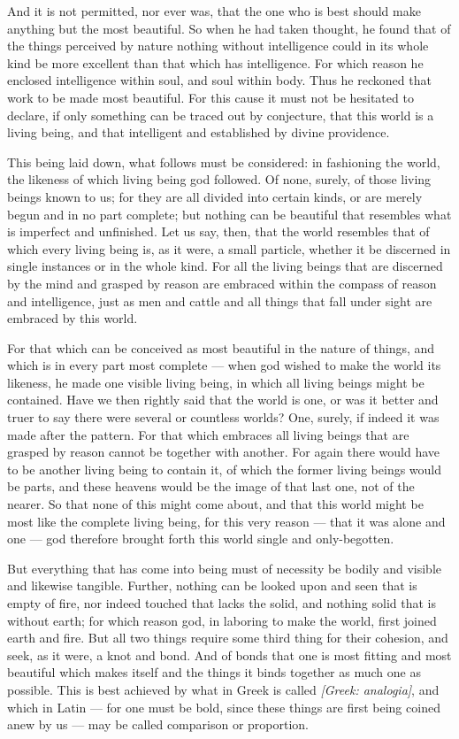  And it is not permitted, nor ever was, that the one who is best should make anything but the most beautiful. So when he had taken thought, he found that of the things perceived by nature nothing without intelligence could in its whole kind be more excellent than that which has intelligence. For which reason he enclosed intelligence within soul, and soul within body. Thus he reckoned that work to be made most beautiful. For this cause it must not be hesitated to declare, if only something can be traced out by conjecture, that this world is a living being, and that intelligent and established by divine providence.

 This being laid down, what follows must be considered: in fashioning the world, the likeness of which living being god followed. Of none, surely, of those living beings known to us; for they are all divided into certain kinds, or are merely begun and in no part complete; but nothing can be beautiful that resembles what is imperfect and unfinished. Let us say, then, that the world resembles that of which every living being is, as it were, a small particle, whether it be discerned in single instances or in the whole kind. For all the living beings that are discerned by the mind and grasped by reason are embraced within the compass of reason and intelligence, just as men and cattle and all things that fall under sight are embraced by this world.

 For that which can be conceived as most beautiful in the nature of things, and which is in every part most complete — when god wished to make the world its likeness, he made one visible living being, in which all living beings might be contained. Have we then rightly said that the world is one, or was it better and truer to say there were several or countless worlds? One, surely, if indeed it was made after the pattern. For that which embraces all living beings that are grasped by reason cannot be together with another. For again there would have to be another living being to contain it, of which the former living beings would be parts, and these heavens would be the image of that last one, not of the nearer. So that none of this might come about, and that this world might be most like the complete living being, for this very reason — that it was alone and one — god therefore brought forth this world single and only-begotten.

 But everything that has come into being must of necessity be bodily and visible and likewise tangible. Further, nothing can be looked upon and seen that is empty of fire, nor indeed touched that lacks the solid, and nothing solid that is without earth; for which reason god, in laboring to make the world, first joined earth and fire. But all two things require some third thing for their cohesion, and seek, as it were, a knot and bond. And of bonds that one is most fitting and most beautiful which makes itself and the things it binds together as much one as possible. This is best achieved by what in Greek is called \textit{[Greek: analogia]}, and which in Latin — for one must be bold, since these things are first being coined anew by us — may be called comparison or proportion.


